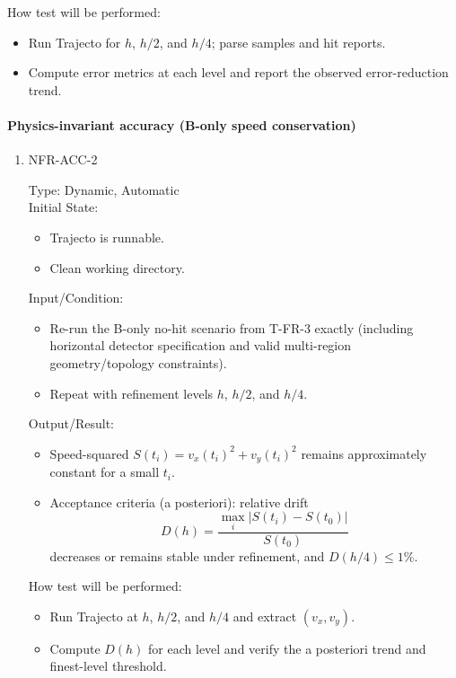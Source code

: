 \documentclass[12pt, titlepage]{article}
\begin{document}
\begin{enumerate}
How test will be performed:
\begin{itemize}
  \item Run Trajecto for $h$, $h/2$, and $h/4$; parse samples and hit reports.
  \item Compute error metrics at each level and report the observed
  error-reduction trend.
\end{itemize}

\end{enumerate}

\paragraph{Physics-invariant accuracy (B-only speed conservation)}

\begin{enumerate}

\item{NFR-ACC-2\\}

Type: Dynamic, Automatic\\

Initial State:
\begin{itemize}
  \item Trajecto is runnable.
  \item Clean working directory.
\end{itemize}

Input/Condition:
\begin{itemize}
  \item Re-run the B-only no-hit scenario from T-FR-3 exactly (including
  horizontal detector specification and valid multi-region geometry/topology
  constraints).
  \item Repeat with refinement levels $h$, $h/2$, and $h/4$.
\end{itemize}

Output/Result:
\begin{itemize}
  \item Speed-squared $S(t_i)=v_x(t_i)^2+v_y(t_i)^2$ remains approximately constant for a small $t_i$.
  \item Acceptance criteria (a posteriori): relative drift
  \[
    D(h)=\frac{\max_i |S(t_i)-S(t_0)|}{S(t_0)}
  \]
  decreases or remains stable under refinement, and $D(h/4)\le 1\%$.
\end{itemize}

How test will be performed:
\begin{itemize}
  \item Run Trajecto at $h$, $h/2$, and $h/4$ and extract $(v_x,v_y)$.
  \item Compute $D(h)$ for each level and verify the a posteriori trend and
  finest-level threshold.
\end{itemize}

\end{enumerate}
\end{document}
